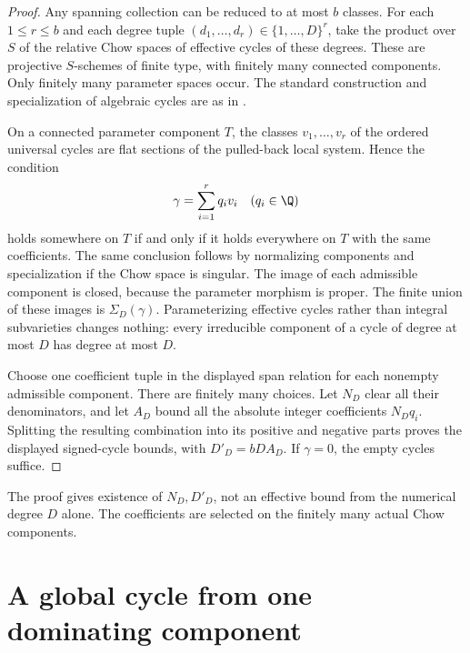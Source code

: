 \begin{proof}
Any spanning collection can be reduced to at most \(b\) classes.
For each \(1\le r\le b\) and each degree tuple
\((d_1,\ldots,d_r)\in\{1,\ldots,D\}^r\), take the product over \(S\)
of the relative Chow spaces of effective cycles of these degrees.
These are projective \(S\)-schemes of finite type, with finitely many
connected components. Only finitely many parameter spaces occur.
The standard construction and specialization of algebraic cycles
are as in \cite{Ful98}.

On a connected parameter component \(T\), the classes
\(v_1,\ldots,v_r\) of the ordered universal cycles are flat sections
of the pulled-back local system. Hence the condition
\[
 \gamma=\sum_{i=1}^r q_i v_i\quad(q_i\in\Q)
\]
holds somewhere on \(T\) if and only if it holds everywhere on \(T\)
with the same coefficients. The same conclusion follows by normalizing
components and specialization if the Chow space is singular.
The image of each admissible component is closed, because the
parameter morphism is proper. The finite union of these images is
\(\Sigma_D(\gamma)\). Parameterizing effective cycles rather than
integral subvarieties changes nothing: every irreducible component
of a cycle of degree at most \(D\) has degree at most \(D\).

Choose one coefficient tuple in the displayed span relation for each nonempty admissible
component. There are finitely many choices. Let \(N_D\) clear all
their denominators, and let \(A_D\) bound all the absolute integer
coefficients \(N_Dq_i\). Splitting the resulting combination into
its positive and negative parts proves the displayed signed-cycle bounds, with
\(D'_D=bD A_D\). If \(\gamma=0\), the empty cycles suffice.
\end{proof}

\begin{remark}
The proof gives existence of \(N_D,D'_D\), not an effective bound
from the numerical degree \(D\) alone. The coefficients are selected
on the finitely many actual Chow components.
\end{remark}

\section{A global cycle from one dominating component}

